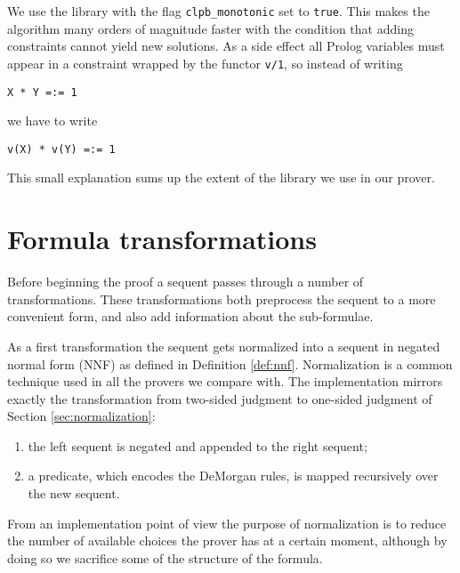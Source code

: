 We use the library with the flag \texttt{clpb\_monotonic} set to \texttt{true}.
This makes the algorithm many orders of magnitude faster with the condition that adding constraints cannot yield new solutions. 
As a side effect all Prolog variables must appear in a constraint wrapped by the functor \texttt{v/1}, so instead of writing
\begin{verbatim}
X * Y =:= 1
\end{verbatim}
we have to write
\begin{verbatim}
v(X) * v(Y) =:= 1
\end{verbatim}
This small explanation sums up the extent of the library we use in our prover.

\section{Formula transformations}
Before beginning the proof a sequent passes through a number of transformations.
These transformations both preprocess the sequent to a more convenient form, and also add information about the sub-formulae.

As a first transformation the sequent gets normalized into a sequent in negated normal form (NNF) as defined in Definition \ref{def:nnf}.
Normalization is a common technique used in all the provers we compare with.
The implementation mirrors exactly the transformation from two-sided judgment to one-sided judgment of Section \ref{sec:normalization}:
\begin{enumerate}
	\item the left sequent is negated and appended to the right sequent;
	\item a predicate, which encodes the DeMorgan rules, is mapped recursively over the new sequent.
\end{enumerate}
From an implementation point of view the purpose of normalization is to reduce the number of available choices the prover has at a certain moment, although by doing so we sacrifice some of the structure of the formula.

